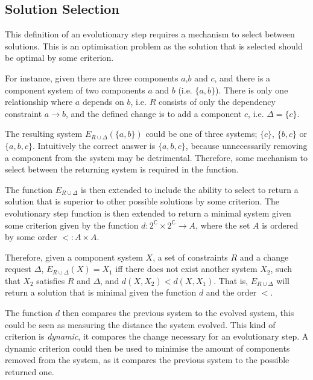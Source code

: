 \subsection{Solution Selection}
\label{formal.solsel}
This definition of an evolutionary step requires a mechanism to select between solutions.
This is an optimisation problem as the solution that is selected should be optimal by some criterion.

For instance, given there are three components $a$,$b$ and $c$, and there is a component system of two components $a$ and $b$ (i.e. $\{a,b\}$).
There is only one relationship where $a$ depends on $b$, i.e. $R$ consists of only the dependency constraint $a \rightarrow b$,
and the defined change is to add a component $c$, i.e. $\Delta = \{c\}$.

The resulting system $E_{R \cup \Delta}(\{a,b\})$ could be one of three systems; $\{c\}$, $\{b,c\}$ or $\{a,b,c\}$.
Intuitively the correct answer is $\{a,b,c\}$, because unnecessarily removing a component from the system may be detrimental.
Therefore, some mechanism to select between the returning system is required in the function.
  
The function $E_{R \cup \Delta}$ is then extended to include the ability to select to return a solution that is superior to other possible solutions by some criterion.
The evolutionary step function is then extended to return a minimal system given some criterion given by the function $d: 2^\mathbb{C} \times 2^\mathbb{C} \rightarrow A$,
where the set $A$ is ordered by some order $<: A \times A$.

Therefore, given a component system $X$, a set of constraints $R$ and a change request $\Delta$,
$E_{R \cup \Delta}(X) = X_1$ iff there does not exist another system $X_2$, such that $X_2$ satisfies $R$ and $\Delta$, 
and $d(X,X_2) < d(X,X_1)$.
That is, $E_{R \cup \Delta}$ will return a solution that is minimal given the function $d$ and the order $<$.

The function $d$ then compares the previous system to the evolved system, this could be seen as measuring the distance the system evolved.
This kind of criterion is \textit{dynamic}, it compares the change necessary for an evolutionary step.
A dynamic criterion could then be used to minimise the amount of components removed from the system, as it compares the previous system to the possible returned one.

